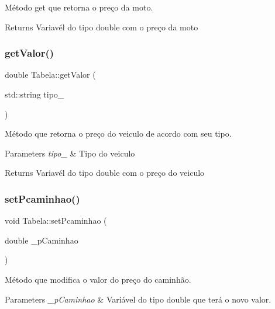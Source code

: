 Método get que retorna o preço da moto. 

\begin{DoxyReturn}{Returns}
Variavél do tipo double com o preço da moto 
\end{DoxyReturn}
\mbox{\label{classTabela_ac49c8952230be93b59e99f4852b8fd06}} 
\subsubsection{\texorpdfstring{get\+Valor()}{getValor()}}
{\footnotesize\ttfamily double Tabela\+::get\+Valor (\begin{DoxyParamCaption}\item[{std\+::string}]{tipo\+\_\+ }\end{DoxyParamCaption})}



Método que retorna o preço do veiculo de acordo com seu tipo. 


\begin{DoxyParams}{Parameters}
{\em tipo\+\_\+} & Tipo do veiculo\\
\hline
\end{DoxyParams}
\begin{DoxyReturn}{Returns}
Variavél do tipo double com o preço do veiculo 
\end{DoxyReturn}
\mbox{\label{classTabela_a668364c58c09fafd78e55039e4b28252}} 
\subsubsection{\texorpdfstring{set\+Pcaminhao()}{setPcaminhao()}}
{\footnotesize\ttfamily void Tabela\+::set\+Pcaminhao (\begin{DoxyParamCaption}\item[{double}]{\+\_\+p\+Caminhao }\end{DoxyParamCaption})}



Método que modifica o valor do preço do caminhão. 


\begin{DoxyParams}{Parameters}
{\em \+\_\+p\+Caminhao} & Variável do tipo double que terá o novo valor. \\
\hline
\end{DoxyParams}
\mbox{\label{classTabela_a6b811be8b22906f261c7bfc93f39386b}} 
